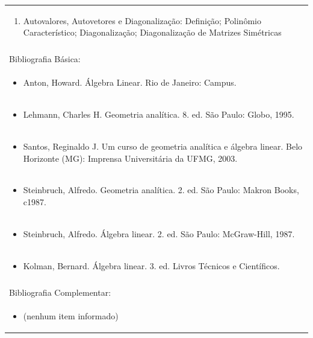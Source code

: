 \documentclass[11pt]{article}
\begin{document}
\begin{center}
\begin{longtable}{|p{4cm}|p{4cm}|p{4cm}|p{4cm}|}
\multicolumn{4}{|p{\dimexpr 16cm + 6\tabcolsep\relax}|}{\begin{enumerate}[start=6]\item Autovalores, Autovetores e Diagonalização: Definição; Polinômio Característico; Diagonalização; Diagonalização de Matrizes Simétricas\end{enumerate}}\\
\multicolumn{4}{|p{\dimexpr 16cm + 6\tabcolsep\relax}|}{}\\
\hline
\multicolumn{4}{|p{16cm}|}{Bibliografia Básica:}\\*
\multicolumn{4}{|p{\dimexpr 16cm + 6\tabcolsep\relax}|}{\begin{itemize}\item Anton, Howard. Álgebra Linear. Rio de Janeiro: Campus.\end{itemize}}\\
\multicolumn{4}{|p{\dimexpr 16cm + 6\tabcolsep\relax}|}{\begin{itemize}\item Lehmann, Charles H. Geometria analítica. 8. ed. São Paulo: Globo, 1995.\end{itemize}}\\
\multicolumn{4}{|p{\dimexpr 16cm + 6\tabcolsep\relax}|}{\begin{itemize}\item Santos, Reginaldo J. Um curso de geometria analítica e álgebra linear. Belo Horizonte (MG): Imprensa Universitária da UFMG, 2003.\end{itemize}}\\
\multicolumn{4}{|p{\dimexpr 16cm + 6\tabcolsep\relax}|}{\begin{itemize}\item Steinbruch, Alfredo. Geometria analítica. 2. ed. São Paulo: Makron Books, c1987.\end{itemize}}\\
\multicolumn{4}{|p{\dimexpr 16cm + 6\tabcolsep\relax}|}{\begin{itemize}\item Steinbruch, Alfredo. Álgebra linear. 2. ed. São Paulo: McGraw-Hill, 1987.\end{itemize}}\\
\multicolumn{4}{|p{\dimexpr 16cm + 6\tabcolsep\relax}|}{\begin{itemize}\item Kolman, Bernard. Álgebra linear. 3. ed. Livros Técnicos e Científicos.\end{itemize}}\\
\multicolumn{4}{|p{16cm}|}{}\\
\hline
\multicolumn{4}{|p{16cm}|}{Bibliografia Complementar:}\\*
\multicolumn{4}{|p{\dimexpr 16cm + 6\tabcolsep\relax}|}{\begin{itemize}\item[] (nenhum item informado)\end{itemize}}\\
\hline
\end{longtable}
\end{center}

\clearpage
\end{document}
